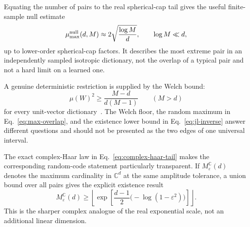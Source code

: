 \documentclass[
  aps,
  reprint,
  superscriptaddress,
  floatfix,
  nofootinbib,
  longbibliography
]{revtex4-2}
\newcommand{\Msem}{M}
\begin{document}
Equating the number of pairs to the real spherical-cap tail gives the useful
finite-sample null estimate
\begin{equation}
\label{eq:max-overlap}
\mu_{\max}^{\rm null}(d,\Msem)
\approx
2\sqrt{\frac{\log\Msem}{d}},
\qquad
\log\Msem\ll d,
\end{equation}
up to lower-order spherical-cap factors.  It describes the most extreme pair
in an independently sampled isotropic dictionary, not the overlap of a
typical pair and not a hard limit on a learned one.

A genuine deterministic restriction is supplied by the Welch bound:
\begin{equation}
\label{eq:welch}
\mu(W)^2
\geq
\frac{\Msem-d}{d(\Msem-1)}
\qquad(\Msem>d)
\end{equation}
for every unit-vector dictionary~\cite{welch1974coherence}.  The Welch floor,
the random maximum in Eq.~\eqref{eq:max-overlap}, and the existence lower
bound in Eq.~\eqref{eq:jl-inverse} answer different questions and should not
be presented as the two edges of one universal interval.

The exact complex-Haar law in Eq.~\eqref{eq:complex-haar-tail} makes the
corresponding random-code statement particularly transparent.  If
$M_\varepsilon^{\mathbb C}(d)$ denotes the maximum cardinality in
$\mathbb C^d$ at the same amplitude tolerance, a union bound over all pairs
gives the explicit existence result
\begin{equation}
\label{eq:complex-code}
M_\varepsilon^{\mathbb C}(d)
\geq
\left\lfloor
\exp\!\left[
\frac{d-1}{2}\bigl(-\log(1-\varepsilon^2)\bigr)
\right]
\right\rfloor .
\end{equation}
This is the sharper complex analogue of the real exponential scale, not an
additional linear dimension.
\end{document}
